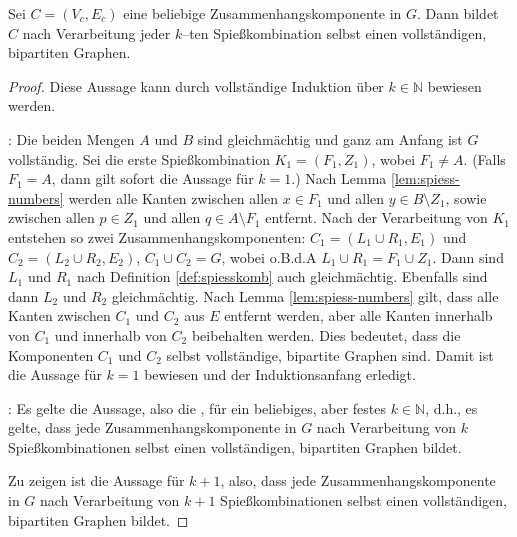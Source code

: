 \begin{lemma}\label{lem:komponente-complete}
Sei $C = (V_c, E_c)$ eine beliebige Zusammenhangskomponente in $G$. 
Dann bildet $C$ nach Verarbeitung jeder $k$--ten Spießkombination
selbst einen vollständigen, bipartiten Graphen.
\end{lemma}

\begin{proof}
Diese Aussage kann durch vollständige Induktion über $k \in \mathbb{N}$ bewiesen werden.

: 
Die beiden Mengen $A$ und $B$ sind gleichmächtig und ganz am Anfang ist $G$ vollständig.
Sei die erste Spießkombination $K_1 = (F_1, Z_1)$, wobei $F_1 \neq A$. (Falls $F_1 = A$,
dann gilt sofort die Aussage für $k = 1$.)
Nach Lemma \ref{lem:spiess-numbers} werden alle Kanten zwischen 
allen $x \in F_1$ und allen $y \in B \setminus Z_1$,
sowie zwischen allen $p \in Z_1$ und allen $q \in A \setminus F_1$ entfernt.
Nach der Verarbeitung von $K_1$ 
entstehen so zwei Zusammenhangskomponenten:
$C_1 = (L_1 \cup R_1, E_1)$ und $C_2 = (L_2 \cup R_2, E_2)$,
$C_1 \cup C_2 = G$, wobei o.B.d.A $L_1 \cup R_1 = F_1 \cup Z_1$.
Dann sind $L_1$ und $R_1$
nach Definition \ref{def:spiesskomb} auch gleichmächtig. 
Ebenfalls sind dann $L_2$ und $R_2$ gleichmächtig.
Nach Lemma \ref{lem:spiess-numbers} gilt, dass alle Kanten zwischen $C_1$ und $C_2$
aus $E$ entfernt werden, aber alle Kanten innerhalb von $C_1$ und innerhalb von $C_2$
beibehalten werden.
Dies bedeutet, dass die Komponenten $C_1$ und $C_2$ selbst vollständige, bipartite Graphen sind.
Damit ist die Aussage für $k = 1$ bewiesen und der Induktionsanfang erledigt.

: Es gelte die Aussage, also die ,
für ein beliebiges, aber festes $k \in \mathbb{N}$, d.h., es gelte,
dass jede Zusammenhangskomponente in $G$ nach Verarbeitung von $k$ Spießkombinationen selbst
einen vollständigen, bipartiten Graphen bildet.

Zu zeigen ist die Aussage für $k + 1$, also, dass jede Zusammenhangskomponente in $G$ nach Verarbeitung
von $k + 1$ Spießkombinationen selbst einen vollständigen, bipartiten Graphen bildet.


\end{proof}
